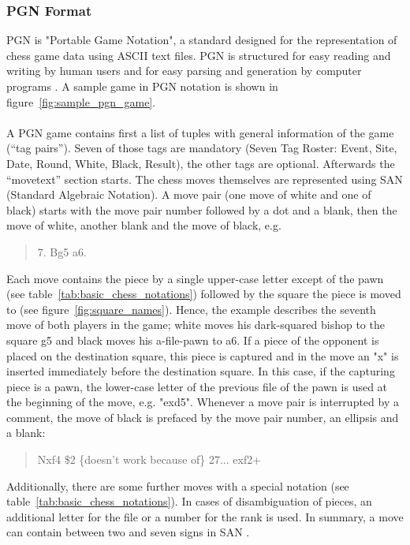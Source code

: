\documentclass[article,type=msc,colorback,accentcolor=tud7b]{tudthesis}
\begin{document}
  \subsubsection{PGN Format}
    PGN is "Portable Game Notation", a standard designed for the representation of chess game data using ASCII text files. PGN is structured for easy reading and writing by human users and for easy parsing and generation by computer programs \autocite[Chapter~1]{Edwards1994}. A sample game in PGN notation is shown in figure~\ref{fig:sample_pgn_game}. \\\\
    A PGN game contains first a list of tuples with general information of the game (“tag pairs”). Seven of those tags are mandatory (Seven Tag Roster: Event, Site, Date, Round, White, Black, Result), the other tags are optional. Afterwards the “movetext” section starts. The chess moves themselves are represented using SAN (Standard Algebraic Notation). A move pair (one move of white and one of black) starts with the move pair number followed by a dot and a blank, then the move of white, another blank and the move of black, e.g. 
    \begin{quotation}
      7. Bg5 a6.
    \end{quotation}    
    Each move contains the piece by a single upper-case letter except of the pawn (see table~\ref{tab:basic_chess_notations}) followed by the square the piece is moved to (see figure~\ref{fig:square_names}). Hence, the example describes the seventh move of both players in the game; white moves his dark-squared bishop to the square g5 and black moves his a-file-pawn to a6. If a piece of the opponent is placed on the destination square, this piece is captured and in the move an "x" is inserted immediately before the destination square. In this case, if the capturing piece is a pawn, the lower-case letter of the previous file of the pawn is used at the beginning of the move, e.g. "exd5". Whenever a move pair is interrupted by a comment, the move of black is prefaced by the move pair number, an ellipsis and a blank: 
    \begin{quotation}
      Nxf4 \$2 \{doesn't work because of\} 27... exf2+
    \end{quotation}
    Additionally, there are some further moves with a special notation (see table~\ref{tab:basic_chess_notations}). In cases of disambiguation of pieces, an additional letter for the file or a number for the rank is used. In summary, a move can contain between two and seven signs in SAN \autocite[Chapter~8]{Edwards1994}.
	
\end{document}
